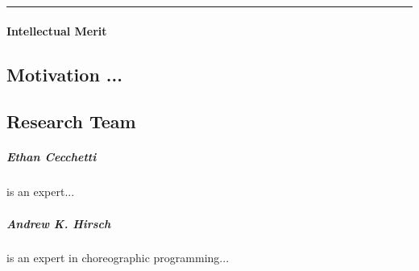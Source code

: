 \hrule
\vspace{0.5em}

\paragraph{Intellectual Merit}


\subsection{Motivation ...}
\label{sec:motivation}


\subsection{Research Team}

\subparagraph{Ethan Cecchetti} is an expert...

\subparagraph{Andrew K. Hirsch} is an expert in choreographic programming...


